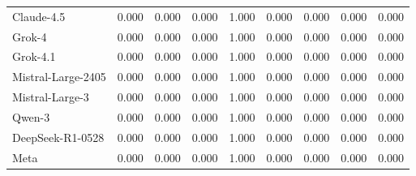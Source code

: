 \begin{tabular}{lrrrrrrrr}
Claude-4.5 & 0.000 & 0.000 & 0.000 & 1.000 & 0.000 & 0.000 & 0.000 & 0.000 \\
Grok-4 & 0.000 & 0.000 & 0.000 & 1.000 & 0.000 & 0.000 & 0.000 & 0.000 \\
Grok-4.1 & 0.000 & 0.000 & 0.000 & 1.000 & 0.000 & 0.000 & 0.000 & 0.000 \\
Mistral-Large-2405 & 0.000 & 0.000 & 0.000 & 1.000 & 0.000 & 0.000 & 0.000 & 0.000 \\
Mistral-Large-3 & 0.000 & 0.000 & 0.000 & 1.000 & 0.000 & 0.000 & 0.000 & 0.000 \\
Qwen-3 & 0.000 & 0.000 & 0.000 & 1.000 & 0.000 & 0.000 & 0.000 & 0.000 \\
DeepSeek-R1-0528 & 0.000 & 0.000 & 0.000 & 1.000 & 0.000 & 0.000 & 0.000 & 0.000 \\
Meta & 0.000 & 0.000 & 0.000 & 1.000 & 0.000 & 0.000 & 0.000 & 0.000 \\
\hline
\end{tabular}
